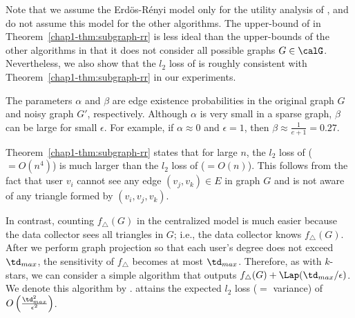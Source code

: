 Note that we assume the Erd\"os-R\'enyi model only for the utility analysis of , and do not assume this model for the other algorithms. 
The upper-bound of  in Theorem~\ref{chap1-thm:subgraph-rr} is less ideal than the upper-bounds of the other algorithms in that it does not consider all possible graphs $G \in \calG$. 
Nevertheless, we also show that the $l_2$ loss of  is roughly consistent with Theorem~\ref{chap1-thm:subgraph-rr} in our experiments. 

The parameters $\alpha$ and $\beta$ are edge existence probabilities in the original graph $G$ and noisy graph $G'$, respectively. 
Although $\alpha$ is very small in a sparse graph, $\beta$ can be large for small $\epsilon$. 
For example, if $\alpha \approx 0$ and $\epsilon=1$, then $\beta \approx \frac{1}{e+1} = 0.27$. 

Theorem~\ref{chap1-thm:subgraph-rr} states that for large $n$, the $l_2$ loss of  
($=O(n^4)$) 
is much larger than the $l_2$ loss of  ($=O(n)$). 
This follows from the fact that user $v_i$ cannot see any edge $(v_j, v_k) \in E$ in graph $G$ and is not aware of any triangle formed by $(v_i, v_j, v_k)$. 

In contrast, counting $f_\triangle(G)$ in the centralized model is much easier because the data collector sees all triangles in $G$; i.e., the data collector knows $f_\triangle(G)$. 
After we perform graph projection \cite{Day_SIGMOD16,Kasiviswanathan_TCC13,Raskhodnikova_arXiv15} so that each user's degree does not exceed $\td_{max}$, 
the 
sensitivity of $f_\triangle$ becomes at most $\td_{max}$. 
Therefore, as with $k$-stars, we can consider a simple algorithm that 
outputs $f_{\triangle}(G) + \Lap(\td_{max}/\epsilon)$. 
We denote this algorithm by . 
 attains the expected $l_2$ loss ($=$ variance) of $O\left(\frac{\td_{max}^2}{\epsilon^2}\right)$. 

